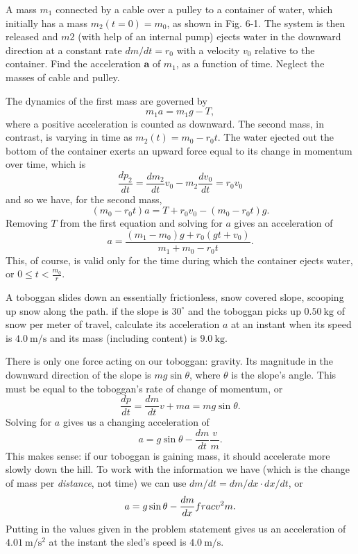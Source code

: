 \documentclass[../feynman-lectures-on-physics.tex]{subfiles}
\begin{document}
\begin{questions}
	\question A mass $m_1$ connected by a cable over a pulley to a container of water, which initially has a mass $m_2(t=0)=m_0$, as shown in Fig. 6-1. The system is then released and $m2$ (with help of an internal pump) ejects water in the downward direction at a constant rate $dm/dt = r_0$ with a velocity $v_0$ relative to the container. Find the acceleration $\mathbf{a}$ of $m_1$, as a function of time. Neglect the masses of cable and pulley.

	\begin{solution}
		The dynamics of the first mass are governed by 
		\[
		m_1a = m_1g - T
		,\] 
		where a positive acceleration is counted as downward. The second mass, in contrast, is varying in time as $m_2(t) = m_0 - r_0t$. The water ejected out the bottom of the container exerts an upward force equal to its change in momentum over time, which is
		\[
			\frac{dp_2}{dt} = \frac{dm_2}{dt}v_0 - m_2\frac{dv_0}{dt} = r_0v_0
		\]
		and so we have, for the second mass, 
		\[
			(m_0 - r_0t)a = T + r_0v_0 - (m_0 - r_0t)g
		.\] 
		Removing $T$ from the first equation and solving for $a$ gives an acceleration of
		\[
			a = \frac{(m_1 - m_0)g + r_0(gt + v_0)}{m_1 + m_0 - r_0t}
		.\] 
		This, of course, is valid only for the time during which the container ejects water, or $0 \leq t < \frac{m_0}{r}$.
	\end{solution}

	\question A toboggan slides down an essentially frictionless, snow covered slope, scooping up snow along the path. if the slope is $30^\circ$ and the toboggan picks up $\SI{0.50}{\kilo\gram}$ of snow per meter of travel, calculate its acceleration $a$ at an instant when its speed is $\SI{4.0}{\meter\per\second}$ and its mass (including content) is $\SI{9.0}{\kilo\gram}$.

	\begin{solution}
		There is only one force acting on our toboggan: gravity. Its magnitude in the downward direction of the slope is $mg\sin\theta$, where $\theta$ is the slope's angle. This must be equal to the toboggan's rate of change of momentum, or
		\[
			\frac{dp}{dt} = \frac{dm}{dt}v + ma = mg\sin\theta
		.\] 
		Solving for $a$ gives us a changing acceleration of
		\[
			a = g\sin\theta - \frac{dm}{dt}\frac{v}{m}
		.\] 
		This makes sense: if our toboggan is gaining mass, it should accelerate more slowly down the hill. To work with the information we have (which is the change of mass per \textit{distance}, not time) we can use $dm/dt = dm/dx\cdot{dx}/dt$, or
		\[
			a = g\sin\theta - \frac{dm}{dx}\\frac{v^2}{m}
		.\]
		Putting in the values given in the problem statement gives us an acceleration of $\SI{4.01}{\meter\per\second\squared}$ at the instant the sled's speed is $\SI{4.0}{\meter\per\second}$.
	\end{solution}


\end{questions}
\end{document}
